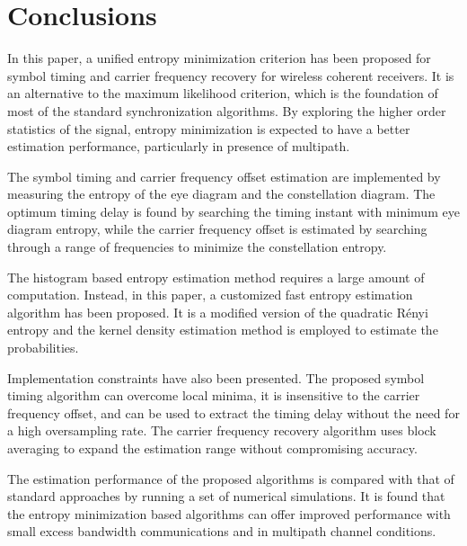 \documentclass[12pt, draftclsnofoot, onecolumn]{IEEEtran}
\begin{document}


\section{Conclusions}
\label{sec:conc}
In this paper, a unified entropy minimization criterion has been proposed for symbol timing and carrier frequency recovery for wireless coherent receivers.
It is an alternative to the maximum likelihood criterion, which is the foundation of most of the standard synchronization algorithms. 
By exploring the higher order statistics of the signal, entropy minimization is expected to have a better estimation performance, particularly in presence of multipath.  

The symbol timing and carrier frequency offset estimation are implemented by measuring the entropy of the eye diagram and the constellation diagram.
% 
% 
The optimum timing delay is found by searching the timing instant with minimum eye diagram entropy, while the carrier frequency offset is estimated by searching through a range of frequencies to minimize the constellation entropy.  

The histogram based entropy estimation method requires a large amount of computation.
Instead, in this paper, a customized fast entropy estimation algorithm has been proposed.
It is a modified version of the quadratic R\'enyi entropy and the kernel density estimation method is employed to estimate the probabilities.

Implementation constraints have also been presented. 
The proposed symbol timing algorithm can overcome local minima, it is insensitive to the carrier frequency offset, and can be used to extract the timing delay without the need for a high oversampling rate.
The carrier frequency recovery algorithm uses block averaging to expand the estimation range without compromising accuracy. 

The estimation performance of the proposed algorithms is compared with that of standard approaches by running a set of numerical simulations.
It is found that the entropy minimization based algorithms can offer improved performance with small excess bandwidth communications and in multipath channel conditions.
% 
% 


\end{document}
